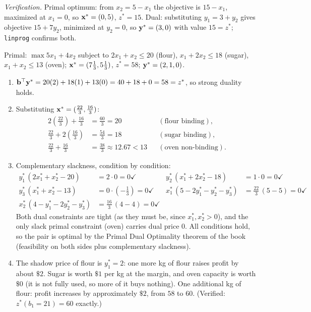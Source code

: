 \emph{Verification.} Primal optimum: from $x_2 = 5 - x_1$ the objective is $15 - x_1$, maximized at $x_1 = 0$, so $\mathbf{x}^* = (0, 5)$, $z^* = 15$. Dual: substituting $y_1 = 3 + y_2$ gives objective $15 + 7y_2$, minimized at $y_2 = 0$, so $\mathbf{y}^* = (3, 0)$ with value $15 = z^*$; \texttt{linprog} confirms both.


Primal: $\max 5x_1 + 4x_2$ subject to $2x_1 + x_2 \le 20$ (flour), $x_1 + 2x_2 \le 18$ (sugar), $x_1 + x_2 \le 13$ (oven); $\mathbf{x}^* = (7\tfrac13, 5\tfrac13)$, $z^* = 58$; $\mathbf{y}^* = (2, 1, 0)$.

\begin{enumerate}
\item $\mathbf{b}^\top\mathbf{y}^* = 20(2) + 18(1) + 13(0) = 40 + 18 + 0 = 58 = z^*$, so strong duality holds.
\item Substituting $\mathbf{x}^* = (\tfrac{22}{3}, \tfrac{16}{3})$:
\[
\begin{aligned}
2\!\left(\tfrac{22}{3}\right) + \tfrac{16}{3} &= \tfrac{60}{3} = 20 && (\text{flour binding}), \\
\tfrac{22}{3} + 2\!\left(\tfrac{16}{3}\right) &= \tfrac{54}{3} = 18 && (\text{sugar binding}), \\
\tfrac{22}{3} + \tfrac{16}{3} &= \tfrac{38}{3} \approx 12.67 < 13 && (\text{oven non-binding}).
\end{aligned}
\]
\item Complementary slackness, condition by condition:
\[
\begin{aligned}
y_1^*\,(2x_1^* + x_2^* - 20) &= 2 \cdot 0 = 0 \checkmark
& y_2^*\,(x_1^* + 2x_2^* - 18) &= 1 \cdot 0 = 0 \checkmark \\
y_3^*\,(x_1^* + x_2^* - 13) &= 0 \cdot \left(-\tfrac13\right) = 0 \checkmark
& x_1^*\,(5 - 2y_1^* - y_2^* - y_3^*) &= \tfrac{22}{3}\,(5 - 5) = 0 \checkmark \\
x_2^*\,(4 - y_1^* - 2y_2^* - y_3^*) &= \tfrac{16}{3}\,(4 - 4) = 0 \checkmark &&
\end{aligned}
\]
Both dual constraints are tight (as they must be, since $x_1^*, x_2^* > 0$), and the only slack primal constraint (oven) carries dual price $0$. All conditions hold, so the pair is optimal by the Primal Dual Optimality theorem of the book (feasibility on both sides plus complementary slackness).
\item The shadow price of flour is $y_1^* = 2$: one more kg of flour raises profit by about $\$2$. Sugar is worth $\$1$ per kg at the margin, and oven capacity is worth $\$0$ (it is not fully used, so more of it buys nothing). One additional kg of flour: profit increases by approximately $\$2$, from $58$ to $60$. (Verified: $z^*(b_1 = 21) = 60$ exactly.)
\end{enumerate}

